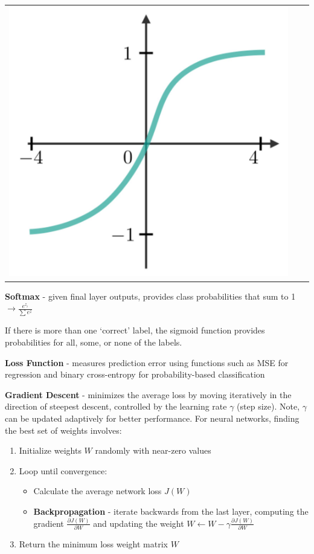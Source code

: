 \documentclass[10pt,landscape]{article}
\begin{document}
\begin{multicols}{3}
\begin{center}
\begin{tabular}{c|c|c}
         \includegraphics[scale = .047]{images/tanh.JPG}

\end{tabular}
\end{center}
\textbf{Softmax} - given final layer outputs, provides class probabilities that sum to 1 $\to \frac{e^{z_i}}{\sum e^{z}}$

If there is more than one `correct' label, the sigmoid function provides probabilities for all, some, or none of the labels.


\smallskip
\textbf{Loss Function} - measures prediction error using functions such as MSE for regression and binary cross-entropy for probability-based classification

\smallskip
\textbf{Gradient Descent} - minimizes the average loss by moving iteratively in the direction of steepest descent, controlled by the learning rate $\gamma$ (step size). Note, $\gamma$ can be updated adaptively for better performance. For neural networks, finding the best set of weights involves:
\begin{enumerate}[leftmargin=5mm]
\itemsep -.4mm
\item Initialize weights $W$ randomly with near-zero values
\item Loop until convergence:
    \begin{itemize}[label={--},leftmargin=4mm]
    \itemsep -.4mm
    \item Calculate the average network loss $J(W)$
    \item \textbf{Backpropagation} - iterate backwards from the last layer, computing the gradient $\frac{\partial J(W)}{\partial W}$ and updating the weight $W \leftarrow W - \gamma \frac{\partial J(W)}{\partial W}$
    \end{itemize}
\item Return the minimum loss weight matrix $W$
\end{enumerate}


\end{multicols}
\end{document}
